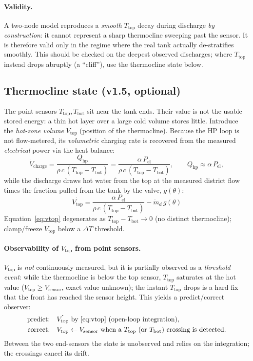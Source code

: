 \documentclass[11pt,a4paper]{article}
\newcommand{\Ttop}{T_{\mathrm{top}}}
\newcommand{\Tbot}{T_{\mathrm{bot}}}
\newcommand{\md}{\dot m_d}         %
\newcommand{\Qhp}{Q_{\mathrm{hp}}}
\newcommand{\Pel}{P_{\mathrm{el}}}
\newcommand{\Vtop}{V_{\mathrm{top}}}
\newcommand{\cw}{c}                %
\begin{document}
\paragraph{Validity.}
A two-node model reproduces a \emph{smooth} $\Ttop$ decay during discharge
\emph{by construction}: it cannot represent a sharp thermocline sweeping past the
sensor. It is therefore valid only in the regime where the real tank actually
de-stratifies smoothly. This should be checked on the deepest observed discharges;
where $\Ttop$ instead drops abruptly (a ``cliff''), use the thermocline state below.

\subsection{Thermocline state (v1.5, optional)}
\label{sec:vtop}
The point sensors $\Ttop,\Tbot$ sit near the tank ends. Their value is not the
usable stored energy: a thin hot layer over a large cold volume stores little.
Introduce the \emph{hot-zone volume} $\Vtop$ (position of the thermocline). Because
the HP loop is not flow-metered, its \emph{volumetric} charging rate is recovered
from the measured \emph{electrical} power via the heat balance:
\begin{equation}
  \dot V_{\text{charge}}
  = \frac{\Qhp}{\rho\,\cw\,(\Ttop-\Tbot)}
  = \frac{\alpha\,\Pel}{\rho\,\cw\,(\Ttop-\Tbot)},
  \qquad \Qhp \approx \alpha\,\Pel,
  \label{eq:vcharge}
\end{equation}
while the discharge draws hot water from the top at the measured district flow times
the fraction pulled from the tank by the valve, $g(\theta)$:
\begin{equation}
  \boxed{\;
  \dot{\Vtop} = \frac{\alpha\,\Pel}{\rho\,\cw\,(\Ttop-\Tbot)}
              - \md\,g(\theta)\; }
  \label{eq:vtop}
\end{equation}
Equation~\eqref{eq:vtop} degenerates as $\Ttop-\Tbot\to0$ (no distinct thermocline);
clamp/freeze $\Vtop$ below a $\Delta T$ threshold.

\paragraph{Observability of $\Vtop$ from point sensors.}
$\Vtop$ is \emph{not} continuously measured, but it is partially observed as a
\emph{threshold event}: while the thermocline is below the top sensor, $\Ttop$
saturates at the hot value ($\Vtop \ge V_{\text{sensor}}$, exact value unknown);
the instant $\Ttop$ drops is a hard fix that the front has reached the sensor
height. This yields a predict/correct observer:
\begin{align}
  \text{predict:}\quad & \dot{\Vtop}\ \text{by }\eqref{eq:vtop}\ \text{(open-loop integration)},\\
  \text{correct:}\quad & \Vtop \leftarrow V_{\text{sensor}}\ \text{when a }\Ttop\ \text{(or }\Tbot\text{) crossing is detected.}
\end{align}
Between the two end-sensors the state is unobserved and relies on the integration;
the crossings cancel its drift.
\end{document}

